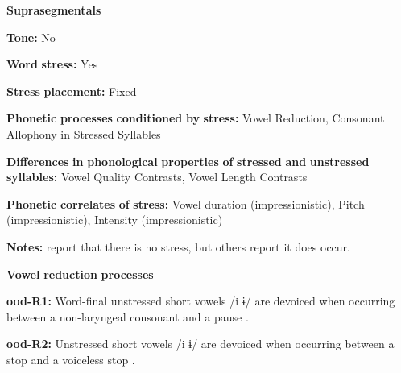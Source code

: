 \begin{styleBody}
\textbf{Suprasegmentals}
\end{styleBody}

\begin{styleBody}
\textbf{Tone:} No
\end{styleBody}

\begin{styleBody}
\textbf{Word} \textbf{stress:} Yes
\end{styleBody}

\begin{styleBody}
\textbf{Stress} \textbf{placement:} Fixed
\end{styleBody}

\begin{styleBody}
\textbf{Phonetic} \textbf{processes} \textbf{conditioned} \textbf{by} \textbf{stress:} Vowel Reduction, Consonant Allophony in Stressed Syllables
\end{styleBody}

\begin{styleBody}
\textbf{Differences} \textbf{in} \textbf{phonological} \textbf{properties} \textbf{of} \textbf{stressed} \textbf{and} \textbf{unstressed} \textbf{syllables:} Vowel Quality Contrasts, Vowel Length Contrasts
\end{styleBody}

\begin{styleBody}
\textbf{Phonetic} \textbf{correlates} \textbf{of} \textbf{stress:} Vowel duration (impressionistic), Pitch (impressionistic), Intensity (impressionistic)
\end{styleBody}

\begin{styleBody}
\textbf{Notes:} \citet{DoloresMathiot1991} report that there is no stress, but others report it does occur.
\end{styleBody}

\begin{styleBody}
\textbf{Vowel} \textbf{reduction} \textbf{processes}
\end{styleBody}

\begin{styleBody}
\textbf{ood-R1:} Word-final unstressed short vowels /i ɨ/ are devoiced when occurring between a non-laryngeal consonant and a pause \citep[31]{Saxton1963}.
\end{styleBody}

\begin{styleBody}
\textbf{ood-R2:} Unstressed short vowels /i ɨ/ are devoiced when occurring between a stop and a voiceless stop \citep[31]{Saxton1963}.
\end{styleBody}

